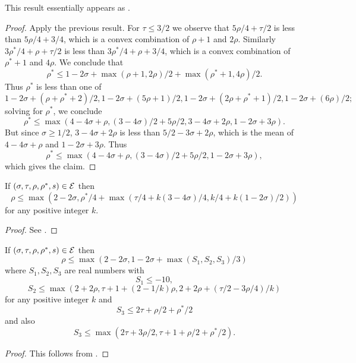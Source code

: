 This result essentially appears as \cite[Lemma 3]{heathbrown_zero_1979}.

\begin{proof} Apply the previous result.  For $\tau \leq 3/2$ we observe that $5\rho/4+\tau/2$ is less than $5\rho/4 + 3/4$, which is a convex combination of $\rho+1$ and $2\rho$.  Similarly $3\rho^*/4+\rho+\tau/2$ is less than $3\rho^*/4+\rho+3/4$, which is a convex combination of $\rho^*+1$ and $4\rho$. We conclude that
$$ \rho^* \leq  1-2\sigma + \max(\rho+1, 2\rho)/2 + \max(\rho^*+1, 4\rho)/2.$$
Thus $\rho^*$ is less than one of
$$ 1-2\sigma + (\rho+\rho^*+2)/2, 1-2\sigma + (5\rho+1)/2, 1-2\sigma + (2\rho+\rho^*+1)/2, 1-2\sigma + (6\rho)/2;$$
solving for $\rho^*$, we conclude
$$ \rho^* \leq \max( 4-4\sigma + \rho, (3-4\sigma)/2 + 5\rho/2, 3-4\sigma + 2\rho, 1-2\sigma + 3\rho).$$
But since $\sigma \geq 1/2$, $3-4\sigma + 2\rho$ is less than $5/2-3\sigma + 2\rho$, which is the mean of $4-4\sigma+\rho$ and $1-2\sigma+3\rho$. Thus
$$ \rho^* \leq \max( 4-4\sigma + \rho, (3-4\sigma)/2 + 5\rho/2, 1-2\sigma + 3\rho),$$
which gives the claim.
\end{proof}


\begin{lemma}\label{hbt-2} If $(\sigma,\tau,\rho,\rho^*,s) \in \mathcal{E}$ then
$$ \rho \leq \max( 2-2\sigma, \rho^*/4 + \max(\tau/4 + k(3-4\sigma)/4, k/4 + k(1-2\sigma)/2))$$
for any positive integer $k$.
\end{lemma}


\begin{proof} See \cite[Lemma 4]{heathbrown_zero_1979}.
\end{proof}

\begin{lemma}\label{gm-1}  If $(\sigma,\tau,\rho,\rho^*,s) \in \mathcal{E}$ then
$$ \rho \leq \max(2-2\sigma, 1-2\sigma + \max(S_1, S_2, S_3)/3)$$
where $S_1, S_2, S_3$ are real numbers with
$$ S_1 \leq -10,$$
$$ S_2 \leq \max(2+2\rho, \tau+1+(2-1/k) \rho, 2 + 2\rho + (\tau/2 - 3\rho/4)/k )$$
for any positive integer $k$ and
$$ S_3 \leq 2\tau + \rho/2 + \rho^*/2$$
and also
$$ S_3 \leq \max( 2\tau + 3\rho/2, \tau+1+\rho/2+\rho^*/2).$$
\end{lemma}

\begin{proof} This follows from \cite[Propositions 4.6, 5.1, 6.1, 8.1, 10.1, (5.5)]{guth-maynard}.
\end{proof}

